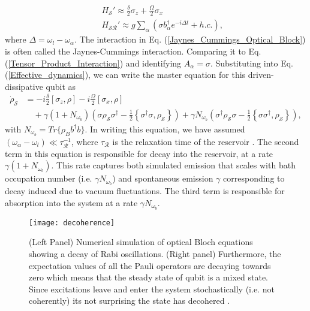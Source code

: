 %
\begin{eqnarray}\label{Jaynes_Cummings_Optical_Block}
& & H_{\mathcal{S}}' \approx \frac{\delta}{2} \sigma_z + \frac{\Omega}{2}\sigma_{x} \nonumber\\
& & H_{\mathcal{SR}}' \approx g \sum_\alpha (\sigma b_{\alpha}^\dagger e^{-i \Delta t} + h.c.),
\end{eqnarray} 
%
where $\Delta = \omega_{l} -\omega_{\alpha}$. The interaction in Eq. (\ref{Jaynes_Cummings_Optical_Block}) is often called the Jaynes-Cummings interaction. Comparing it to Eq.(\ref{Tensor_Product_Interaction}) and identifying $A_\alpha = \sigma$. Substituting into Eq. (\ref{Effective_dynamics}), we can write the master equation for this driven-dissipative qubit as
%
\begin{align}\label{Optical Block ME}
\dot{\rho}_{\mathcal{S}} & =  - i \frac{\delta}{2} [ \sigma_z, \rho ] - i \frac{\Omega}{2} [ \sigma_x , \rho ] \nonumber \\
& \quad + \gamma ( 1 + N_{\omega_b} ) \left( \sigma \rho_{\mathcal{S}} \sigma^\dagger - \frac{1}{2} \left\lbrace \sigma^\dagger \sigma , \rho_{\mathcal{S}} \right\rbrace \right) + \gamma N_{\omega_b} \left( \sigma^\dagger \rho_{\mathcal{S}} \sigma - \frac{1}{2} \left\lbrace \sigma \sigma^\dagger , \rho_{\mathcal{S}} \right\rbrace \right),
\end{align}
%
with $N_{\omega_b} = Tr\{\rho_{B}b^{\dagger}b\}$. In writing this equation, we have assumed $(\omega_{\alpha} - \omega_{l}) \ll \tau_{\mathcal{R}}^{-1}$, where $\tau_{\mathcal{R}}$ is the relaxation time of the reservoir \cite{TheoryOfOpen}. The second term in this equation is responsible for decay into the reservoir, at a rate $\gamma ( 1 + N_{\omega_b} )$. This rate captures both simulated emission that scales with bath occupation number (i.e. $\gamma N_{\omega_b}$) and spontaneous emission $\gamma$ corresponding to decay induced due to vacuum fluctuations. The third term is responsible for absorption into the system at a rate $\gamma N_{\omega_b}$.  
%
\begin{figure}[t!]
\centering
\texttt{[image: decoherence]}
\caption{(Left Panel) Numerical simulation of optical Bloch equations showing a decay of Rabi oscillations. (Right panel) Furthermore, the expectation values of all the Pauli operators are  decaying towards zero which means that the steady state of qubit is a mixed state. Since excitations leave and enter the system stochastically (i.e. not coherently) its not surprising the state has decohered \cite{WF_approach_Quantum_Dyanmics}.}
\label{Fig:OBESim}
\end{figure}
